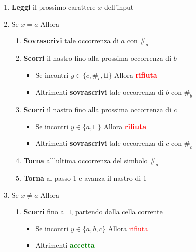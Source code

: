 \begin{enumerate}[label=\arabic*.]
    \item \textbf{Leggi} il prossimo carattere $x$ dell'input
    \item Se $x = a$ Allora
    \begin{enumerate}[label=\arabic*.]
        \item \textbf{Sovrascrivi} tale occorrenza di $a$ con $\#_a$
        \item \textbf{Scorri} il nastro fino alla prossima occorrenza di $b$
        \begin{itemize}[label=--]
            \item Se incontri $y \in \{c, \#_c, \sqcup\}$ Allora \textcolor{red}{\textbf{rifiuta}}
            \item Altrimenti \textbf{sovrascrivi} tale occorrenza di $b$ con $\#_b$
        \end{itemize}
        \item \textbf{Scorri} il nastro fino alla prossima occorrenza di $c$
        \begin{itemize}[label=--]
            \item Se incontri $y \in \{a, \sqcup\}$ Allora \textcolor{red}{\textbf{rifiuta}}
            \item Altrimenti \textbf{sovrascrivi} tale occorrenza di $c$ con $\#_c$
        \end{itemize}
        \item \textbf{Torna} all'ultima occorrenza del simbolo $\#_a$
        \item \textbf{Torna} al passo 1 e avanza il nastro di 1
    \end{enumerate}
    \item Se $x \neq a$ Allora
    \begin{enumerate}[label=\arabic*.]
        \item \textbf{Scorri} fino a $\sqcup$, partendo dalla cella corrente
        \begin{itemize}[label=--]
            \item Se incontri $y \in \{a, b, c\}$ Allora \textcolor{red}{rifiuta}
            \item Altrimenti \textcolor{green}{\textbf{accetta}}
        \end{itemize}
    \end{enumerate}
\end{enumerate}


